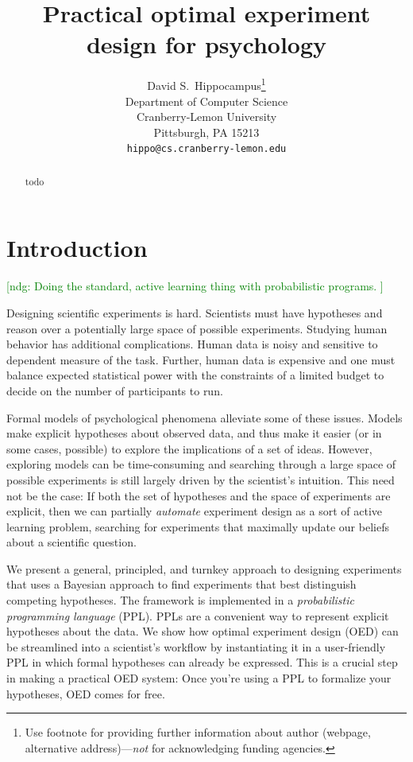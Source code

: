 \documentclass{article}
\title{Practical optimal experiment design for psychology}
\author{
  David S.~Hippocampus\thanks{Use footnote for providing further
    information about author (webpage, alternative
    address)---\emph{not} for acknowledging funding agencies.} \\
  Department of Computer Science\\
  Cranberry-Lemon University\\
  Pittsburgh, PA 15213 \\
  \texttt{hippo@cs.cranberry-lemon.edu} \\
}
\newcommand{\ndg}[1]{\textcolor{Green}{[ndg: #1]}}
\newcommand{\lou}[1]{\textcolor{orange}{[lou: #1]}}
\begin{document}

\maketitle

\begin{abstract}
todo
\end{abstract}

\section{Introduction}
\ndg{Doing the standard, active learning thing with probabilistic programs. }

Designing scientific experiments is hard.
Scientists must have hypotheses and reason over a potentially large space of possible experiments.
Studying human behavior has additional complications.
Human data is noisy and sensitive to dependent measure of the task.
Further, human data is expensive and one must balance expected statistical power with the constraints of a limited budget to decide on the number of participants to run.

Formal models of psychological phenomena alleviate some of these issues.
Models make explicit hypotheses about observed data, and thus make it easier (or in some cases, possible) to explore the implications of a set of ideas.
However, exploring models can be time-consuming and searching through a large space of possible experiments is still largely driven by the scientist's intuition.
This need not be the case: If both the set of hypotheses and the space of experiments are explicit, then we can partially \emph{automate} experiment design as a sort of active learning problem, searching for experiments that maximally update our beliefs about a scientific question.

We present a general, principled, and turnkey approach to designing experiments that uses a Bayesian approach to find experiments that best distinguish competing hypotheses.
The framework is implemented in a \emph{probabilistic programming language} (PPL).
PPLs are a convenient way to represent explicit hypotheses about the data.
We show how optimal experiment design (OED) can be streamlined into a scientist's workflow by instantiating it in a user-friendly PPL in which formal hypotheses can already be expressed.
This is a crucial step in making a practical OED system: Once you're using a PPL to formalize your hypotheses, OED comes for free.
\end{document}

